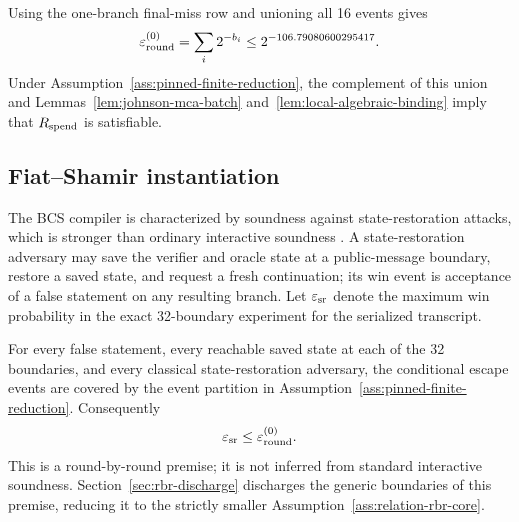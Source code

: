 Using the one-branch final-miss row and unioning all 16 events gives
\begin{equation}
 \varepsilon_{\rm round}^{(0)}
   =\sum_i 2^{-b_i}
   \le 2^{-106.79080600295417}.
 \label{eq:coarse-interactive-error}
\end{equation}
Under Assumption~\ref{ass:pinned-finite-reduction}, the complement of this
union and Lemmas~\ref{lem:johnson-mca-batch}
and~\ref{lem:local-algebraic-binding} imply that \(R_{\mathrm{spend}}\) is satisfiable.

\subsection{Fiat--Shamir instantiation}

The BCS compiler is characterized by soundness against state-restoration
attacks, which is stronger than ordinary interactive soundness
\cite{BenSassonChiesaSpooner2016,BlockGarretaKatzThalerTiwariZajac2023}.
A state-restoration adversary may save the verifier and oracle state at a
public-message boundary, restore a saved state, and request a fresh
continuation; its win event is acceptance of a false statement on any
resulting branch.  Let \(\varepsilon_{\rm sr}\) denote the maximum win
probability in the exact 32-boundary experiment for the serialized
transcript.

\begin{assumption}
\label{ass:boundary-restoration}
For every false statement, every reachable saved state at each of the 32
boundaries, and every classical state-restoration adversary, the conditional
escape events are covered by the event partition in
Assumption~\ref{ass:pinned-finite-reduction}.  Consequently
\[
 \varepsilon_{\rm sr}\le\varepsilon_{\rm round}^{(0)}.
\]
This is a round-by-round premise; it is not inferred from standard
interactive soundness.  Section~\ref{sec:rbr-discharge} discharges the generic
boundaries of this premise, reducing it to the strictly smaller
Assumption~\ref{ass:relation-rbr-core}.
\end{assumption}

